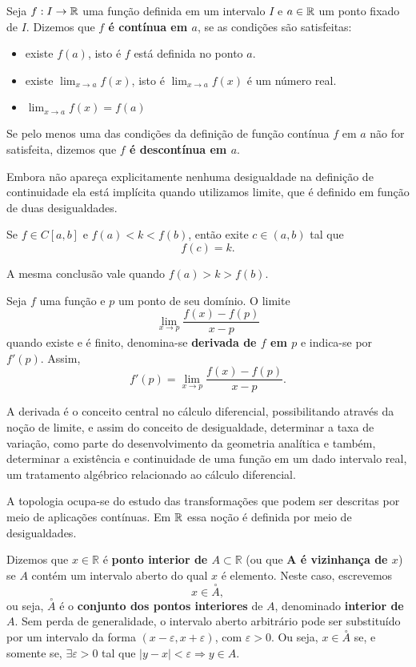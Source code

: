\documentclass[glenn,refnum,codigo]{Estilo}
\begin{document}
\begin{define}[Continuidade]
	Seja $f: I \rightarrow \mathbb{R}$ uma função definida em um intervalo $I$ e $a \in \mathbb{R}$
	um ponto fixado de $I$. Dizemos que \textbf{$f$ é contínua em $a$}, se as
	condições são satisfeitas:
	\begin{itemize}
		\item existe $f(a)$, isto é $f$ está definida no ponto $a$.
		\item existe $\displaystyle\lim_{x \rightarrow a}f(x)$, isto é
		$\displaystyle\lim_{x \rightarrow a}f(x)$ é um número real.
		\item $\displaystyle\lim_{x \rightarrow a}f(x)=f(a)$
	\end{itemize}
	Se pelo menos uma das condições da definição de função contínua $f$ em $a$ não
	for
	satisfeita, dizemos que \textbf{$f$ é descontínua em $a$}.
\end{define}

Embora não apareça explicitamente nenhuma desigualdade na definição de
continuidade ela está implícita quando utilizamos limite, que é definido em
função de duas desigualdades.

\begin{teorema}
	Se $f \in C[a,b]$ e $f(a) < k < f(b)$, então exite
	$c \in (a, b)$ tal que
	\[
	f(c) = k.
	\]
\end{teorema}
A mesma conclusão vale quando $f(a) > k > f(b)$.

\begin{define}[Derivada]
	Seja $f$ uma função  e $p$ um ponto de seu domínio. O limite
	\[
	\lim_{x \rightarrow p}\frac{f(x)-f(p)}{x-p}
	\]
	quando existe e é finito, denomina-se \textbf{derivada de $f$ em $p$} e
	indica-se por $f'(p)$. Assim,
	\[
	f'(p)=\lim_{x \rightarrow p}\frac{f(x)-f(p)}{x-p}.
	\]
\end{define}

A derivada é o conceito central no cálculo diferencial, possibilitando através
da noção de limite, e assim do conceito de desigualdade, determinar a taxa de
variação, como parte do desenvolvimento da geometria analítica e também,
determinar a existência e continuidade de uma função em um dado intervalo real,
um tratamento algébrico relacionado ao cálculo diferencial.

A topologia ocupa-se do estudo das transformações que podem ser descritas por
meio de aplicações contínuas. Em $\mathbb{R}$ essa noção é definida por meio de
desigualdades.

\begin{define}
	Dizemos que $x \in \mathbb{R} $ é\textbf{ ponto interior de $A \subset
		\mathbb{R}$} (ou que \textbf{A é vizinhança
		de $x$}) se $A$ contém um intervalo aberto do qual $x$ é elemento. Neste caso,
	escrevemos
	\[
	x \in \stackrel{\circ}{A},
	\]
	ou seja, $\stackrel{\circ}{A}$ é o \textbf{conjunto dos pontos interiores} de
	$A$, denominado \textbf{interior de $A$}.
	Sem perda de generalidade, o intervalo aberto arbitrário pode ser substituído
	por um intervalo da forma $(x - \varepsilon, x + \varepsilon)$, com $\varepsilon
	> 0$. Ou seja, $x \in \stackrel{\circ}{A}$ se, e somente se,
	$\exists \varepsilon > 0$ tal que $\mid y - x \mid < \varepsilon \Rightarrow y
	\in A$.
\end{define}
\end{document}
